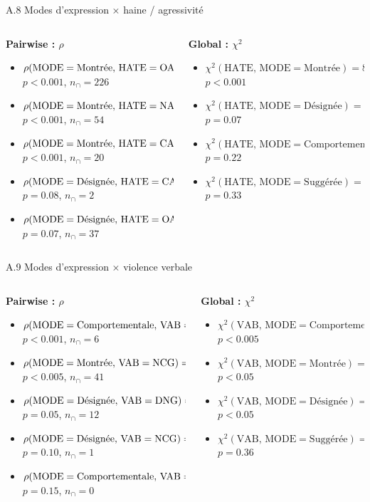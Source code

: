 \documentclass[aspectratio=169,10pt,xcolor=table]{beamer}
\newcommand{\pval}[1]{\ensuremath{#1}}
\newcommand{\pos}[1]{\textcolor{Positive}{#1}}
\newcommand{\negcorr}[1]{\textcolor{Negative}{#1}}
\newcommand{\rhoitem}[7]{\item \(\rho(\mathrm{#1}=\text{#2},\,\mathrm{#3}=\text{#4}) = #5\)\\[-0.15em]{\tiny \(p\pval{#6}\), \(n_{\cap}=#7\)}}
\newcommand{\chiitem}[5]{\item \(\chi^2(\mathrm{#1},\,\mathrm{#2}=\text{#3}) = #4\)\\[-0.15em]{\tiny \(p\pval{#5}\)}}
\begin{document}
\begin{frame}{A.8 Modes d'expression × haine / agressivité}
\scriptsize
\begin{columns}[T,onlytextwidth]
\begin{column}{0.49\textwidth}
\textbf{Pairwise : \(\rho\)}
\begin{itemize}
\setlength\itemsep{0.55em}
\rhoitem{MODE}{Montrée}{HATE}{OAG}{\pos{0.33}}{<0.001}{226}
\rhoitem{MODE}{Montrée}{HATE}{NAG}{\negcorr{-0.26}}{<0.001}{54}
\rhoitem{MODE}{Montrée}{HATE}{CAG}{\negcorr{-0.13}}{<0.001}{20}
\rhoitem{MODE}{Désignée}{HATE}{CAG}{\negcorr{-0.07}}{=0.08}{2}
\rhoitem{MODE}{Désignée}{HATE}{OAG}{\pos{0.07}}{=0.07}{37}
\end{itemize}
\end{column}
\begin{column}{0.49\textwidth}
\textbf{Global : \(\chi^2\)}
\begin{itemize}
\setlength\itemsep{0.55em}
\chiitem{HATE}{MODE}{Montrée}{83.92}{<0.001}
\chiitem{HATE}{MODE}{Désignée}{5.45}{=0.07}
\chiitem{HATE}{MODE}{Comportementale}{3.07}{=0.22}
\chiitem{HATE}{MODE}{Suggérée}{2.24}{=0.33}
\end{itemize}
\end{column}
\end{columns}
\end{frame}

\begin{frame}{A.9 Modes d'expression × violence verbale}
\scriptsize
\begin{columns}[T,onlytextwidth]
\begin{column}{0.49\textwidth}
\textbf{Pairwise : \(\rho\)}
\begin{itemize}
\setlength\itemsep{0.55em}
\rhoitem{MODE}{Comportementale}{VAB}{THR}{\pos{0.17}}{<0.001}{6}
\rhoitem{MODE}{Montrée}{VAB}{NCG}{\pos{0.13}}{<0.005}{41}
\rhoitem{MODE}{Désignée}{VAB}{DNG}{\pos{0.09}}{=0.05}{12}
\rhoitem{MODE}{Désignée}{VAB}{NCG}{\negcorr{-0.08}}{=0.10}{1}
\rhoitem{MODE}{Comportementale}{VAB}{NCG}{\negcorr{-0.08}}{=0.15}{0}
\end{itemize}
\end{column}
\begin{column}{0.49\textwidth}
\textbf{Global : \(\chi^2\)}
\begin{itemize}
\setlength\itemsep{0.55em}
\chiitem{VAB}{MODE}{Comportementale}{17.60}{<0.005}
\chiitem{VAB}{MODE}{Montrée}{12.44}{<0.05}
\chiitem{VAB}{MODE}{Désignée}{10.04}{<0.05}
\chiitem{VAB}{MODE}{Suggérée}{4.37}{=0.36}
\end{itemize}
\end{column}
\end{columns}
\end{frame}
\end{document}
